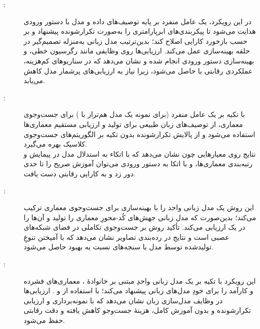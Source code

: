 \begin{description}
    \item[\cite{zhang2023usingLLMforHPO}:]
          در این رویکرد، یک عامل منفرد بر پایه توصیف‌های داده و مدل با دستور ورودی هدایت می‌شود تا پیکربندی‌های ابرپارامتری را به‌صورت تکرارشونده پیشنهاد و بر حسب بازخورد کارایی اصلاح کند؛ بدین‌ترتیب مدل زبانی به‌منزله تصمیم‌گیر در حلقه بهینه‌سازی عمل می‌کند. ارزیابی‌ها روی وظایفی مانند رگرسیون خطی،  و بهینه‌سازی دستور ورودی انجام شده و نشان می‌دهد که در سناریوهای کم‌هزینه، عملکردی رقابتی با  حاصل می‌شود، زیرا نیاز به ارزیابی‌های پرشمار مدل کاهش می‌یابد.

    \item[\cite{zheng2023GENIUS}:]
          با تکیه بر یک عامل منفرد (برای نمونه یک مدل هم‌تراز با ) برای جست‌وجوی معماری،
          از توصیف‌های زبان طبیعی برای تولید و ارزیابی مستقیم معماری‌ها استفاده می‌شود و از پالایش تکرارشونده بدون تکیه بر الگوریتم‌های جست‌وجوی کلاسیک بهره می‌گیرد. \\
          نتایج روی معیارهایی چون  نشان می‌دهد که با اتکاء به استدلال مدل در پیمایش و رتبه‌بندی معماری‌ها،
          و با اتکا به دستور ورودی  می‌توان آموزش صریح را تا حدی دور زد و به کارایی رقابتی دست یافت.

    \item[\cite{LLMatic2024}:]
          این روش یک مدل زبانی واحد را با بهینه‌سازی  برای جست‌وجوی معماری ترکیب می‌کند؛ بدین‌صورت که مدل زبانی جهش‌های کُد-محورِ معماری را تولید و آن‌ها را در یک  ارزیابی می‌کند. تأکید روش بر جست‌وجوی تکاملی در فضای شبکه‌های عصبی است و نتایج در رده‌بندی تصاویر نشان می‌دهد که با آمیختن تنوعِ تولیدشده توسط مدل با سنجه‌های  نسبت به  بهبود حاصل می‌شود.

    \item[\cite{sarah2024llamaNAS}:]
          این رویکرد با تکیه بر یک مدل زبانی واحدِ مبتنی بر خانوادهٔ ، معماری‌های فشرده و کارآمد را برای خودِ مدل‌های زبانی پیشنهاد می‌کند؛ با استفاده از  و . ارزیابی‌ها در وظایف مدل‌سازی زبان نشان می‌دهد که با نمونه‌برداری و ارزیابی تکرارشونده و بدون آموزش کامل، هزینهٔ جست‌وجو کاهش یافته و دقت رقابتی حفظ می‌شود.


\end{description}
